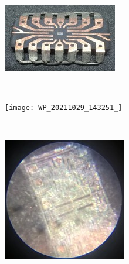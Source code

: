 \documentclass{scrartcl}
\begin{document}
        \begin{figure}[h]
        \begin{subfigure}[b]{0.3\textwidth}
            \includegraphics[width=\textwidth]{WP1_09}
            \end{subfigure}
        ~
        \begin{subfigure}[b]{0.3\textwidth}
            \texttt{[image: WP\_20211029\_143251\_]}
            \end{subfigure}
        ~
        \begin{subfigure}[b]{0.3\textwidth}
            \includegraphics[width=\textwidth]{WP_20210917_16_56_15}
            \end{subfigure}
        \end{figure}
\end{document}
